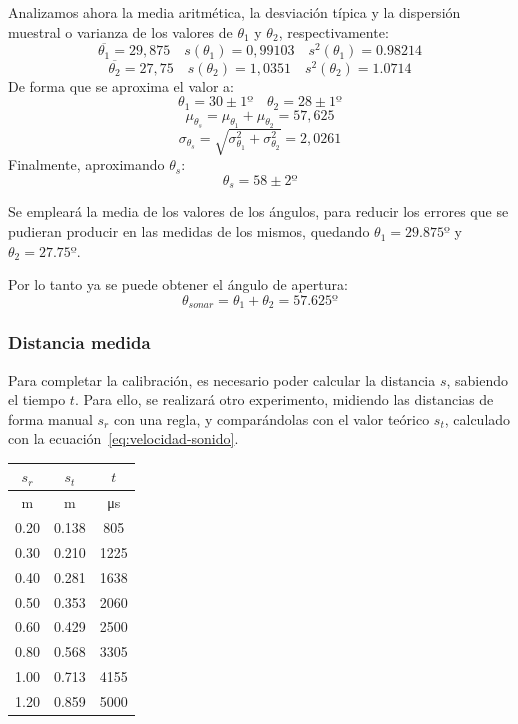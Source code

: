 \documentclass[10pt,a4paper,hidelinks]{article}
\begin{document}
\begin{multicols}{2}
Analizamos ahora la media aritmética, la desviación típica y la dispersión 
muestral o varianza de los valores de $\theta_1$ y $\theta_2$, respectivamente:
$$ \overline{\theta_1} = 29,875 \quad s(\theta_1) = 0,99103 \quad s^2(\theta_1) 
= 0.98214 $$
$$ \overline{\theta_2} = 27,75 \quad s(\theta_2) = 1,0351 \quad s^2(\theta_2) = 
1.0714 $$
De forma que se aproxima el valor a:
$$ \theta_1 = 30 \pm 1º \quad \theta_2 = 28 \pm 1º $$
$$\mu_{\theta_s} = \mu_{\theta_1} + \mu_{\theta_2} = 57,625 $$
$$\sigma_{\theta_s} = \sqrt{\sigma_{\theta_1}^2 + \sigma_{\theta_2}^2} = 2,0261 
$$
Finalmente, aproximando $\theta_s$:
$$\theta_s = 58 \pm 2º$$


Se empleará la media de los valores de los ángulos, para reducir los errores que
se pudieran producir en las medidas de los mismos, quedando $\theta_1 = 29.875
º$ y $\theta_2 = 27.75 º$.

Por lo tanto ya se puede obtener el ángulo de apertura:
$$\theta_{sonar} = \theta_1 + \theta_2 = 57.625 º $$

\subsubsection{Distancia medida}

Para completar la calibración, es necesario poder calcular la distancia $s$,
sabiendo el tiempo $t$. Para ello, se realizará otro experimento, midiendo las
distancias de forma manual $s_r$ con una regla, y comparándolas con el valor
teórico $s_t$, calculado con la ecuación~\ref{eq:velocidad-sonido}.

\begin{center}
\begin{tabular}{ | c | c | c | }
\hline
$s_{r}$ & $s_{t}$ & $t$ \\ \hline
m & m & \si{\micro\second} \\ \hline \hline
0.20 & 0.138 &  805 \\ \hline
0.30 & 0.210 & 1225 \\ \hline
0.40 & 0.281 & 1638 \\ \hline
0.50 & 0.353 & 2060 \\ \hline
0.60 & 0.429 & 2500 \\ \hline
0.80 & 0.568 & 3305 \\ \hline
1.00 & 0.713 & 4155 \\ \hline
1.20 & 0.859 & 5000 \\ \hline
\end{tabular}
\end{center}


\end{multicols}
\end{document}

